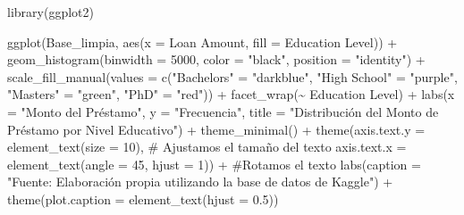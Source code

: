 \documentclass[
  letterpaper,
  DIV=11,
  numbers=noendperiod]{scrreprt}
\newenvironment{Shaded}{\begin{snugshade}}{\end{snugshade}}
\newcommand{\AttributeTok}[1]{\textcolor[rgb]{0.40,0.45,0.13}{#1}}
\newcommand{\CommentTok}[1]{\textcolor[rgb]{0.37,0.37,0.37}{#1}}
\newcommand{\DecValTok}[1]{\textcolor[rgb]{0.68,0.00,0.00}{#1}}
\newcommand{\FloatTok}[1]{\textcolor[rgb]{0.68,0.00,0.00}{#1}}
\newcommand{\FunctionTok}[1]{\textcolor[rgb]{0.28,0.35,0.67}{#1}}
\newcommand{\NormalTok}[1]{\textcolor[rgb]{0.00,0.23,0.31}{#1}}
\newcommand{\OtherTok}[1]{\textcolor[rgb]{0.00,0.23,0.31}{#1}}
\newcommand{\SpecialCharTok}[1]{\textcolor[rgb]{0.37,0.37,0.37}{#1}}
\newcommand{\StringTok}[1]{\textcolor[rgb]{0.13,0.47,0.30}{#1}}
\begin{document}
\begin{Shaded}
\begin{Highlighting}[]
\FunctionTok{library}\NormalTok{(ggplot2)}

\FunctionTok{ggplot}\NormalTok{(Base\_limpia, }\FunctionTok{aes}\NormalTok{(}\AttributeTok{x =} \StringTok{\textasciigrave{}}\AttributeTok{Loan Amount}\StringTok{\textasciigrave{}}\NormalTok{, }\AttributeTok{fill =} \StringTok{\textasciigrave{}}\AttributeTok{Education Level}\StringTok{\textasciigrave{}}\NormalTok{)) }\SpecialCharTok{+}  
  \FunctionTok{geom\_histogram}\NormalTok{(}\AttributeTok{binwidth =} \DecValTok{5000}\NormalTok{, }\AttributeTok{color =} \StringTok{"black"}\NormalTok{, }\AttributeTok{position =} \StringTok{"identity"}\NormalTok{) }\SpecialCharTok{+}  
  \FunctionTok{scale\_fill\_manual}\NormalTok{(}\AttributeTok{values =} \FunctionTok{c}\NormalTok{(}\StringTok{"Bachelor\textquotesingle{}s"} \OtherTok{=} \StringTok{"darkblue"}\NormalTok{, }\StringTok{"High School"} \OtherTok{=} \StringTok{"purple"}\NormalTok{, }\StringTok{"Master\textquotesingle{}s"} \OtherTok{=} \StringTok{"green"}\NormalTok{, }\StringTok{"PhD"} \OtherTok{=} \StringTok{"red"}\NormalTok{)) }\SpecialCharTok{+}  
  \FunctionTok{facet\_wrap}\NormalTok{(}\SpecialCharTok{\textasciitilde{}} \StringTok{\textasciigrave{}}\AttributeTok{Education Level}\StringTok{\textasciigrave{}}\NormalTok{) }\SpecialCharTok{+}  
  \FunctionTok{labs}\NormalTok{(}\AttributeTok{x =} \StringTok{"Monto del Préstamo"}\NormalTok{, }\AttributeTok{y =} \StringTok{"Frecuencia"}\NormalTok{, }\AttributeTok{title =} \StringTok{"Distribución del Monto de Préstamo por Nivel Educativo"}\NormalTok{) }\SpecialCharTok{+} 
  \FunctionTok{theme\_minimal}\NormalTok{() }\SpecialCharTok{+}
  \FunctionTok{theme}\NormalTok{(}\AttributeTok{axis.text.y =} \FunctionTok{element\_text}\NormalTok{(}\AttributeTok{size =} \DecValTok{10}\NormalTok{), }\CommentTok{\# Ajustamos el tamaño del texto}
        \AttributeTok{axis.text.x =} \FunctionTok{element\_text}\NormalTok{(}\AttributeTok{angle =} \DecValTok{45}\NormalTok{, }\AttributeTok{hjust =} \DecValTok{1}\NormalTok{)) }\SpecialCharTok{+} \CommentTok{\#Rotamos el texto}
  \FunctionTok{labs}\NormalTok{(}\AttributeTok{caption =} \StringTok{"Fuente: Elaboración propia utilizando la base de datos de Kaggle"}\NormalTok{) }\SpecialCharTok{+}
\FunctionTok{theme}\NormalTok{(}\AttributeTok{plot.caption =} \FunctionTok{element\_text}\NormalTok{(}\AttributeTok{hjust =} \FloatTok{0.5}\NormalTok{)) }
\end{Highlighting}
\end{Shaded}
\end{document}
